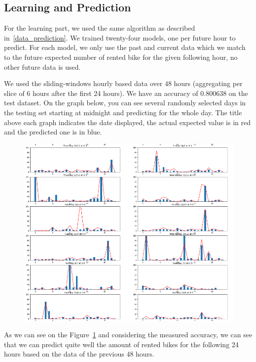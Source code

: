 \subsection{Learning and Prediction}

For the learning part, we used the same algorithm as described in~\ref{data_prediction}.
We trained twenty-four models, one per future hour to predict.
For each model, we only use the past and current data which we match to
the future expected number of rented bike for the given following hour,
no other future data is used.

We used the sliding-windows hourly based data over 48 hours (aggregating per slice
of 6 hours after the first 24 hours).
We have an accuracy of 0.800638 on the test dataset.
On the graph below, you can see several randomly selected days in the testing set
starting at midnight and predicting for the whole day. The title above each graph
indicates the date displayed, the actual expected value is in red and the
predicted one is in blue.
\begin{figure}[H]
\hspace{-0.9cm}
\includegraphics[width=1.1\textwidth]{img/hourly_predictions}
\label{fig:hourly_pred}
\end{figure}

As we can see on the Figure~\ref{fig:hourly_pred} and considering the measured accuracy,
we can see that we can predict quite well the amount of rented bikes for the following
24 hours based on the data of the previous 48 hours.
